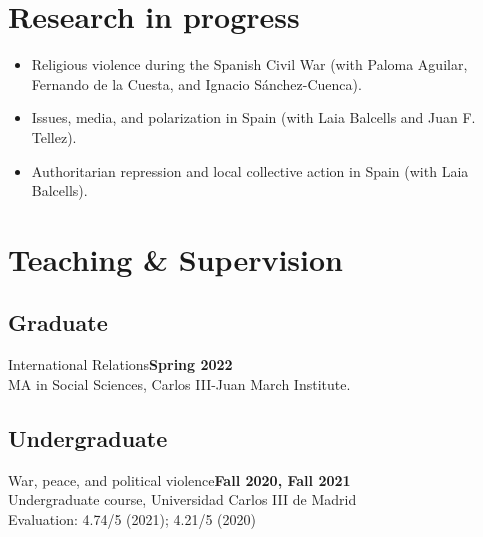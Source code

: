 \documentclass[a4paper, 12pt]{article}
\begin{document}
\section*{Research in progress}

\begin{itemize}[leftmargin=*, nolistsep]
\item Religious violence during the Spanish Civil War (with Paloma Aguilar, Fernando de la Cuesta, and Ignacio Sánchez-Cuenca).
\item Issues, media, and polarization in Spain (with Laia Balcells and Juan F. Tellez).
\item Authoritarian repression and local collective action in Spain (with Laia Balcells).
\end{itemize}

\section*{Teaching \& Supervision}


\subsection*{Graduate}

\noindent
International Relations\hfill\textbf{Spring 2022}\\
{\small MA in Social Sciences, Carlos III-Juan March Institute.}

\vspace{-10pt}
\subsection*{Undergraduate}

\noindent
War, peace, and political violence\hfill\textbf{Fall 2020, Fall 2021}\\
{\small Undergraduate course, Universidad Carlos III de Madrid}\\
{\small Evaluation: 4.74/5 (2021); 4.21/5 (2020)}
\vspace{10pt}
\end{document}
